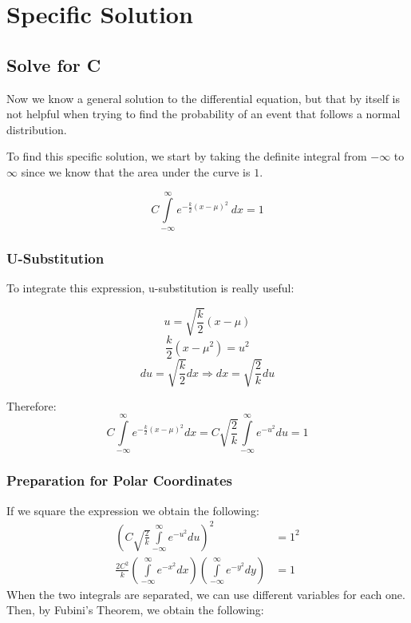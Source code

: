 \documentclass{article}
\begin{document}
\section{Specific Solution}
\subsection{Solve for C}
Now we know a general solution to the differential equation, but that by itself
is not helpful when trying to find the probability of an event that follows a
normal distribution.

To find this specific solution, we start by taking the definite integral from
$-\infty$ to $\infty$ since we know that the area under the curve is $1$.

\begin{equation}
  C\int\limits_{-\infty}^{\infty}e^{-\frac{k}{2}\left(x-\mu\right)^2}\ dx=1
\end{equation}

\subsubsection{U-Substitution}

To integrate this expression, u-substitution is really useful:

\begin{multicols}{3}
  \begin{equation}
    u=\sqrt{\frac{k}{2}}(x-\mu)
  \end{equation}
  \vfill\columnbreak
  \begin{equation}
    \frac{k}{2}(x-\mu^2)=u^2
  \end{equation}
  \vfill\columnbreak
  \begin{equation}
    du=\sqrt{\frac{k}{2}}dx\Longrightarrow dx=\sqrt{\frac{2}{k}}du
  \end{equation}
\end{multicols}
Therefore:
\begin{equation}
  C\int\limits_{-\infty}^{\infty}e^{-\frac{k}{2}(x-\mu)^2}dx=C\sqrt{\frac{2}{k}} \int\limits_{-\infty}^{\infty}e^{-u^2}du=1
\end{equation}

\subsubsection{Preparation for Polar Coordinates}

If we square the expression we obtain the following:
\begin{align}
  \left( C\sqrt{\frac{2}{k}}\int\limits_{-\infty}^{\infty}e^{-u^2}du \right)^2&=1^2\\
  \frac{2C^2}{k}\left( \int\limits_{-\infty}^{\infty}e^{-x^2}dx \right)  \left(\int\limits_{-\infty}^{\infty}e^{-y^2}dy \right)&=1
\end{align}
When the two integrals are separated, we can use different variables for each
one. Then, by Fubini's Theorem, we obtain the following:
\end{document}
